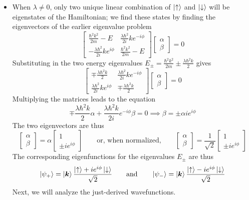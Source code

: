 \documentclass[11pt, a4paper]{article}
\newcommand{\eqtext}[1]{\qquad \text{#1} \qquad}
\renewcommand{\vec}[1]{\bm{#1}} %
\newcommand{\ua}{\uparrow}  %
\newcommand{\da}{\downarrow}  %
\renewcommand{\k}{\vec{k}}  %
\begin{document}
\begin{itemize}
	\item When $ \lambda \neq 0 $, only two unique linear combination of $ \ket{\ua} $ and $ \ket{\da} $ will be eigenstates of the Hamiltonian; we find these states by finding the eigenvectors of the earlier eigenvalue problem
	\begin{equation*}
		\begin{bmatrix}
		\frac{\hbar^{2}k^{2}}{2m} - E & \frac{\lambda \hbar^{2}}{2i}ke^{-i\phi} \\[1mm]
		-\frac{\lambda \hbar^{2}}{2i}ke^{i\phi} & \frac{\hbar^{2}k^{2}}{2m} - E
		\end{bmatrix}
		\begin{bmatrix}
			\alpha\\
			\beta
		\end{bmatrix}
		= 0
	\end{equation*}
	Substituting in the two energy eigenvalues $ E_{\pm} = \frac{\hbar^{2}k^{2}}{2m} \pm \frac{\lambda \hbar^{2}k}{2} $ gives
	\begin{equation*}
		\begin{bmatrix}
		\mp \frac{\lambda \hbar^{2}k}{2}  & \frac{\lambda \hbar^{2}}{2i}ke^{-i\phi} \\[1mm]
		\frac{\lambda \hbar^{2}}{2i}ke^{i\phi} & \mp \frac{\lambda \hbar^{2}k}{2} 
		\end{bmatrix}
		\begin{bmatrix}
			\alpha\\
			\beta
		\end{bmatrix}
		= 0
	\end{equation*}
	Multiplying the matrices leads to the equation
	\begin{equation*}
		\mp \frac{\lambda \hbar^{2}k}{2}\alpha + \frac{\lambda \hbar^{2}k}{2i} e^{-i\phi} \beta = 0 \implies \beta = \pm \alpha i e^{i\phi}
	\end{equation*}
	The two eigenvectors are thus
	\begin{equation*}
		\begin{bmatrix}
			\alpha\\
			\beta
		\end{bmatrix}
		= 
		\alpha 
		\begin{bmatrix}
			1 \\
			\pm ie^{i\phi}
		\end{bmatrix}
		\eqtext{or, when normalized,}
		\begin{bmatrix}
			\alpha\\
			\beta
		\end{bmatrix}
		= 
		\frac{1}{\sqrt{2}} 
		\begin{bmatrix}
			1 \\
			\pm ie^{i\phi}
		\end{bmatrix}
	\end{equation*}
	The corresponding eigenfunctions for the eigenvalues $ E_{\pm} $ are thus
	\begin{equation*}
		\ket{\psi_{+}} = \ket{\k}\frac{\ket{\ua} + ie^{i\phi}\ket{\da}}{\sqrt{2}} \eqtext{and} \ket{\psi_{-}} =  \ket{\k}\frac{\ket{\ua} - ie^{i\phi}\ket{\da}}{\sqrt{2}}
	\end{equation*}
	Next, we will analyze the just-derived wavefunctions.
\end{itemize}
\end{document}
